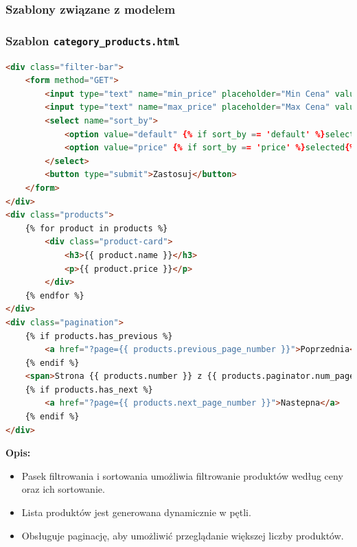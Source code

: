 \documentclass[12pt,a4paper,oneside]{article}
\theoremstyle{definition}
\numberwithin{equation}{section}
\begin{document}
\subsubsection{Szablony związane z modelem}


\subsubsection*{Szablon \texttt{category\_products.html}}
\begin{lstlisting}[language=HTML, caption=Szablon \texttt{category\_products.html}]
<div class="filter-bar">
    <form method="GET">
        <input type="text" name="min_price" placeholder="Min Cena" value="{{ min_price }}">
        <input type="text" name="max_price" placeholder="Max Cena" value="{{ max_price }}">
        <select name="sort_by">
            <option value="default" {% if sort_by == 'default' %}selected{% endif %}>Domyslnie</option>
            <option value="price" {% if sort_by == 'price' %}selected{% endif %}>Cena</option>
        </select>
        <button type="submit">Zastosuj</button>
    </form>
</div>
<div class="products">
    {% for product in products %}
        <div class="product-card">
            <h3>{{ product.name }}</h3>
            <p>{{ product.price }}</p>
        </div>
    {% endfor %}
</div>
<div class="pagination">
    {% if products.has_previous %}
        <a href="?page={{ products.previous_page_number }}">Poprzednia</a>
    {% endif %}
    <span>Strona {{ products.number }} z {{ products.paginator.num_pages }}</span>
    {% if products.has_next %}
        <a href="?page={{ products.next_page_number }}">Nastepna</a>
    {% endif %}
</div>
\end{lstlisting}

\textbf{Opis:}
\begin{itemize}
    \item Pasek filtrowania i sortowania umożliwia filtrowanie produktów według ceny oraz ich sortowanie.
    \item Lista produktów jest generowana dynamicznie w pętli.
    \item Obsługuje paginację, aby umożliwić przeglądanie większej liczby produktów.
\end{itemize}
\end{document}
